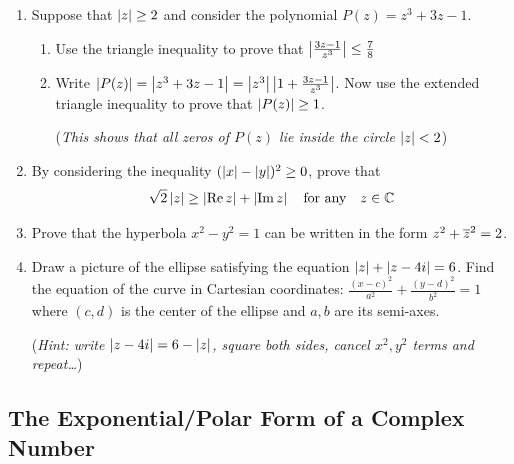 \begin{exercises*}
\begin{enumerate}
	  \item Suppose that $\left| z\right|\ge 2$ and consider the polynomial $P(z)=z^3+3z-1$.
	  \begin{enumerate}
	    \item Use the triangle inequality to prove that $\left| \frac{3z-1}{z^3}\right|\le\frac 78$
	    \item Write $\left| P(z)\right|=\left| z^3+3z-1\right|=\left| z^3\right|\left| 1+\frac{3z-1}{z^3}\right|$. Now use the extended triangle inequality to prove that $\left| P(z)\right|\ge 1$.\par
	    (\emph{This shows that all zeros of $P(z)$ lie inside the circle $\left| z\right|<2$})
		\end{enumerate}
		
	 	\item By considering the inequality $(\left| x\right|-\left| y\right|)^2\ge 0$, prove that
	 	\[
	 		\sqrt 2\left| z\right|\ge \left| \operatorname{Re} z\right|+\left| \operatorname{Im} z\right| \quad\text{for any}\quad z\in\mathbb{C}
	 	\]
	 	
	 	\item Prove that the hyperbola $x^2-y^2=1$ can be written in the form $z^2+\overline{z}^2=2$.
	 	 
	  \item Draw a picture of the ellipse satisfying the equation $\left| z\right|+\left| z-4i\right|=6$. Find the equation of the curve in Cartesian coordinates: $\frac{(x-c)^2}{a^2}+\frac{(y-d)^2}{b^2}=1$ where $(c,d)$ is the center of the ellipse and $a,b$ are its semi-axes.\par
	  (\emph{Hint: write $\left| z-4i\right|=6-\left| z\right|$, square both sides, cancel $x^2,y^2$ terms and repeat\ldots})
	\end{enumerate}
\end{exercises*}


\clearpage



\subsection[The Polar Form]{The Exponential/Polar Form of a Complex Number}


